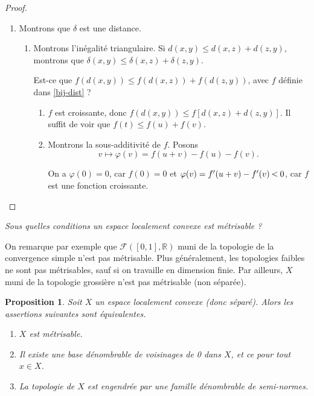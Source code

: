 \documentclass[french]{book}
\newtheorem{prop}{Proposition}[section]
\newcommand{\lesss}{\rotatebox[origin=c]{90}{$\land$}}
\newcommand{\less}{\ \lesss\ }
\begin{document}
\begin{proof}
\begin{enumerate}
    \item Montrons que $\delta$ est une distance.

    \begin{enumerate}
      \item Montrons l'inégalité triangulaire. Si $d(x,y) \leq d(x,z) + d(z,y)$, montrons que $\delta(x,y) \leq \delta(x,z) + \delta(z,y)$.

      Est-ce que \(f(d(x,y)) \leq f(d(x,z))+ f(d(z,y))\), avec \(f\) définie dans \ref{bij-dist} ?

      \begin{enumerate}
        \item $f$ est croissante, donc \(f(d(x,y)) \leq f[d(x,z) + d(z,y)]\). Il suffit de voir que $f(t) \leq f(u)+f(v)$.

        \item Montrons la sous-additivité de $f$. Posons \[v  \mapsto \varphi(v) =  f(u+v) - f(u) - f(v). \]

        On a \(\varphi(0) = 0\), car \(f(0) =0\) et \(\varphi(v) = f'(u+v) - f'(v) \less 0\), car $f$ est une fonction croissante.
      \end{enumerate}
    \end{enumerate}
  \end{enumerate}
\end{proof}

\emph{Sous quelles conditions un espace localement convexe est métrisable ?}

On remarque par exemple que $\mathscr{F}([0, 1], \mathbb{R})$ muni de la topologie de la convergence simple n'est pas métrisable. Plus généralement, les topologies faibles ne sont pas métrisables, sauf si on travaille en dimension finie. Par ailleurs, \(X\) muni de la topologie grossière n'est pas métrisable (non séparée).

\begin{prop}\label{elc-metr}
  Soit \(X\) un espace localement convexe (donc séparé). Alors les assertions suivantes sont équivalentes.

  \begin{enumerate}
    \item \(X\) est métrisable.
    \item Il existe une base dénombrable de voisinages de 0 dans \(X\), et ce pour tout \(x \in X\).
    \item La topologie de \(X\) est engendrée par une famille dénombrable de semi-normes.
  \end{enumerate}
\end{prop}
\end{document}
